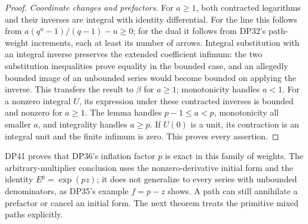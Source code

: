 \begin{proof}
\emph{Coordinate changes and prefactors.}
For $a\ge1$, both contracted logarithms and their inverses are integral with identity differential. For the line this follows from
$a(q^u-1)/(q-1)-u\ge0$; for the dual it follows from DP32's path-weight increments, each at least its number of arrows. Integral substitution with an integral inverse preserves the extended coefficient infimum: the two substitution inequalities prove equality in the bounded case, and an allegedly bounded image of an unbounded series would become bounded on applying the inverse.
This transfers the result to $\beta$ for $a\ge1$; monotonicity handles $a<1$.
For a nonzero integral $U$, its expression under these contracted inverses is bounded and nonzero for $a\ge1$. The lemma handles $p-1\le a<p$, monotonicity all smaller $a$, and integrality handles $a\ge p$. If $U(0)$ is a unit, its contraction is an integral unit and the finite infimum is zero. This proves every assertion.
\end{proof}

DP41 proves that DP36's inflation factor $p$ is exact in this family of weights. The arbitrary-multiplier conclusion uses the nonzero-derivative initial form and the identity $E^p=\exp(pz)$; it does not generalize to every series with unbounded denominators, as DP35's example $f=p-z$ shows. A path can still annihilate a prefactor or cancel an initial form. The next theorem treats the primitive mixed paths explicitly.

